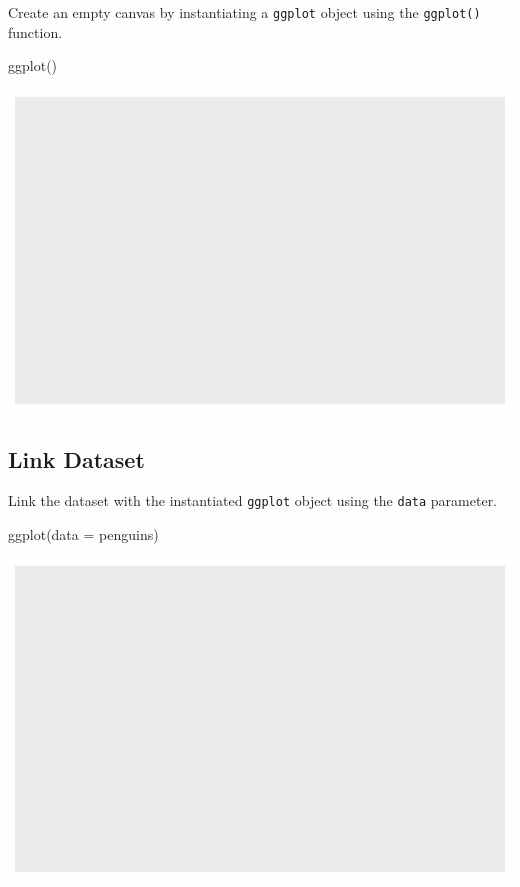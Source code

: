 \documentclass[
  letterpaper,
  DIV=11,
  numbers=noendperiod]{scrreprt}
\newenvironment{Shaded}{\begin{snugshade}}{\end{snugshade}}
\newcommand{\AttributeTok}[1]{\textcolor[rgb]{0.40,0.45,0.13}{#1}}
\newcommand{\FunctionTok}[1]{\textcolor[rgb]{0.28,0.35,0.67}{#1}}
\newcommand{\NormalTok}[1]{\textcolor[rgb]{0.00,0.23,0.31}{#1}}
\begin{document}
Create an empty canvas by instantiating a \texttt{ggplot} object using
the \texttt{ggplot()} function.

\begin{Shaded}
\begin{Highlighting}[]
\FunctionTok{ggplot}\NormalTok{()}
\end{Highlighting}
\end{Shaded}

\includegraphics{src/r-for-data-science/01-data-viz_files/figure-pdf/unnamed-chunk-4-1.pdf}

\subsection{Link Dataset}\label{link-dataset}

Link the dataset with the instantiated \texttt{ggplot} object using the
\texttt{data} parameter.

\begin{Shaded}
\begin{Highlighting}[]
\FunctionTok{ggplot}\NormalTok{(}\AttributeTok{data =}\NormalTok{ penguins)}
\end{Highlighting}
\end{Shaded}

\includegraphics{src/r-for-data-science/01-data-viz_files/figure-pdf/unnamed-chunk-5-1.pdf}
\end{document}
